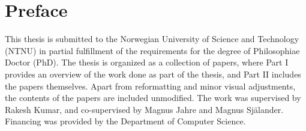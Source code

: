 \documentclass[../main.tex]{subfiles}
\begin{document}
\chapter{Preface}

This thesis is submitted to the Norwegian University of Science and Technology (NTNU) in partial fulfillment of the requirements for the degree of Philosophiae Doctor (PhD). The thesis is organized as a collection of papers, where Part I provides an overview of the work done as part of the thesis, and Part II includes the papers themselves. Apart from reformatting and minor visual adjustments, the contents of the papers are included unmodified. The work was supervised by Rakesh Kumar, and co-supervised by Magnus Jahre and Magnus Själander. Financing was provided by the Department of Computer Science.
\end{document}

